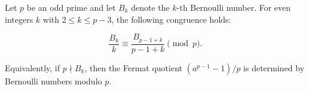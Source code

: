 Let $p$ be an odd prime and let $B_k$ denote the $k$-th Bernoulli number. For even integers $k$ with $2 \leq k \leq p-3$, the following congruence holds:

$$\frac{B_k}{k} \equiv \frac{B_{p-1+k}}{p-1+k} \pmod{p}.$$

Equivalently, if $p \nmid B_k$, then the Fermat quotient $(a^{p-1} - 1)/p$ is determined by Bernoulli numbers modulo $p$.
